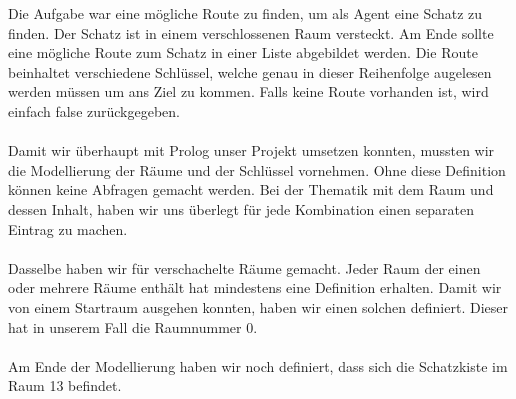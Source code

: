 Die Aufgabe war eine mögliche Route zu finden, um als Agent eine 
Schatz zu finden. Der Schatz ist in einem verschlossenen Raum versteckt.
Am Ende sollte eine mögliche Route zum Schatz in einer Liste abgebildet
werden. Die Route beinhaltet verschiedene Schlüssel, welche genau in dieser
Reihenfolge augelesen werden müssen um ans Ziel zu kommen. Falls keine Route 
vorhanden ist, wird einfach false zurückgegeben.\\
\\
Damit wir überhaupt mit Prolog unser Projekt umsetzen konnten, mussten wir die 
Modellierung der Räume und der Schlüssel vornehmen. Ohne diese Definition können 
keine Abfragen gemacht werden. Bei der Thematik mit dem Raum und dessen Inhalt,
haben wir uns überlegt für jede Kombination einen separaten Eintrag zu machen. \\
\\
Dasselbe haben wir für verschachelte Räume gemacht. Jeder Raum der einen oder mehrere
Räume enthält hat mindestens eine Definition erhalten. Damit wir von einem Startraum
ausgehen konnten, haben wir einen solchen definiert. Dieser hat in unserem Fall 
die Raumnummer 0.\\
\\
Am Ende der Modellierung haben wir noch definiert, dass sich die Schatzkiste im 
Raum 13 befindet. 